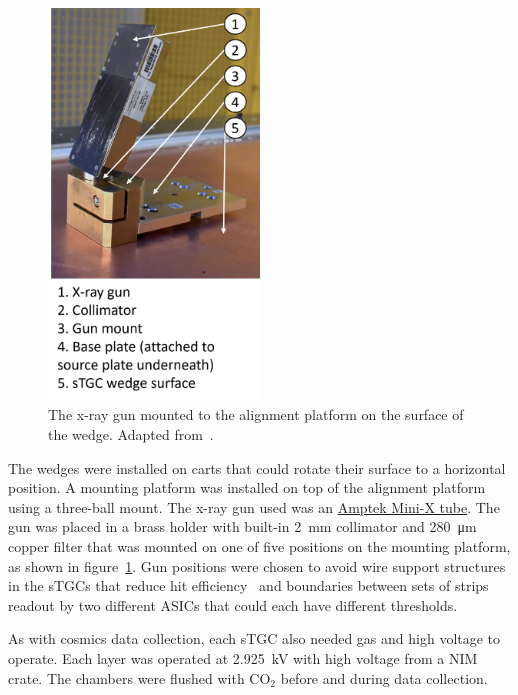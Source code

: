 \begin{figure}
    \centering
    \includegraphics[width = 0.5\textwidth]{figures/figure_xray_setup.pdf}
    \caption{The x-ray gun mounted to the alignment platform on the surface of the wedge. Adapted from~\cite{lefebvre_precision_2020}.}
    \label{fig:xray_setup}
\end{figure}

The wedges were installed on carts that could rotate their surface to a horizontal position. A mounting platform was installed on top of the alignment platform using a three-ball mount. The x-ray gun used was an \href{https://www.amptek.com/-/media/ametekamptek/documents/resources/specs/mini-x-specifications.pdf?la=en\&revision=512f7eb3-01b3-47fd-864f-5525c850fc6e\&hash=B8B03C0592486E2D91C566C4326F15F5}{Amptek Mini-X tube}. The gun was placed in a brass holder with built-in \SI{2}{mm} collimator and \SI{280}{\micro\meter} copper filter that was mounted on one of five positions on the mounting platform, as shown in figure~\ref{fig:xray_setup}. Gun positions were chosen to avoid wire support structures in the sTGCs that reduce hit efficiency~\cite{lefebvre_thesis} and boundaries between sets of strips readout by two different ASICs that could each have different thresholds. 

As with cosmics data collection, each sTGC also needed gas and high voltage to operate. Each layer was operated at \SI{2.925}{kV} with high voltage from a NIM crate. The chambers were flushed with CO$_2$ before and during data collection.

